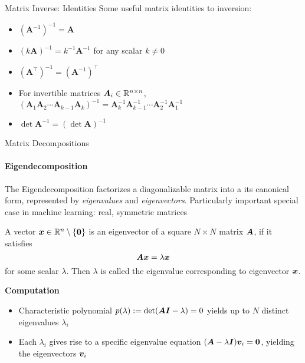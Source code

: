 
\begin{frame}{Matrix Inverse: Identities}
    Some useful matrix identities to inversion:
    \begin{boxed}
        \begin{itemize}
            \item $(\mathbf A^{-1})^{-1} = \mathbf A$
            \item $(k \mathbf A)^{-1} = k^{-1} \mathbf A^{-1}$ for any scalar $k \neq 0$
            \item $(\mathbf A^\top)^{-1} = (\mathbf A^{-1})^\top$
            \item For invertible matrices $\bm{A}_i \in \mathbb{R}^{n \times n}$, $(\mathbf A_1 \mathbf A_2 \cdots \mathbf A_{k-1} \mathbf A_k)^{-1} = \mathbf A_k^{-1} \mathbf A_{k-1}^{-1} \cdots \mathbf A_2^{-1} \mathbf A_1^{-1}$
            \item $\det \mathbf A^{-1} = (\det \mathbf A)^{-1}$
        \end{itemize}
    \end{boxed}
\end{frame}

\begin{frame}{Matrix Decompositions}
    \framesubtitle{Eigendecomposition}
    The Eigendecomposition factorizes a diagonalizable matrix into a its canonical form,
    represented by \emph{eigenvalues} and \emph{eigenvectors}. Particularly important special case
    in machine learning: real, symmetric matrices

    \begin{boxed}
        A vector $\bm{x} \in \mathbb{R}^n \setminus \{\bm{0}\}$ is an eigenvector of a square $N \times N$ matrix $\bm{A}$, if it satisfies
        $$\bm{A} \bm{x} = \lambda \bm{x}$$
        for some scalar $\lambda$. Then $\lambda$ is called the eigenvalue corresponding to eigenvector $\bm{x}$.
    \end{boxed}

    \textbf{Computation}
    \begin{itemize}
        \item Characteristic polynomial $p(\lambda) := \det (\bm{A} \bm{I} - \lambda) = 0$ yields up to $N$ distinct eigenvalues $\lambda_i$
        \item Each $\lambda_i$ gives rise to a specific eigenvalue equation $(\bm{A}  - \lambda \bm{I})\bm{v}_i = \bm{0}$,
              yielding the eigenvectors $\bm{v}_i$
    \end{itemize}

\end{frame}

